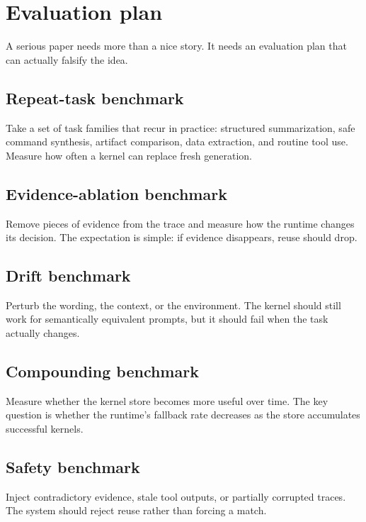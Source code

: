 \documentclass{article}
\begin{document}
\section{Evaluation plan}

A serious paper needs more than a nice story. It needs an evaluation plan that can actually falsify the idea.

\subsection{Repeat-task benchmark}
Take a set of task families that recur in practice: structured summarization, safe command synthesis, artifact comparison, data extraction, and routine tool use. Measure how often a kernel can replace fresh generation.

\subsection{Evidence-ablation benchmark}
Remove pieces of evidence from the trace and measure how the runtime changes its decision. The expectation is simple: if evidence disappears, reuse should drop.

\subsection{Drift benchmark}
Perturb the wording, the context, or the environment. The kernel should still work for semantically equivalent prompts, but it should fail when the task actually changes.

\subsection{Compounding benchmark}
Measure whether the kernel store becomes more useful over time. The key question is whether the runtime’s fallback rate decreases as the store accumulates successful kernels.

\subsection{Safety benchmark}
Inject contradictory evidence, stale tool outputs, or partially corrupted traces. The system should reject reuse rather than forcing a match.
\end{document}
